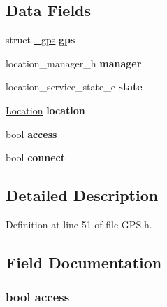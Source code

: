 \subsection*{Data Fields}
\begin{DoxyCompactItemize}
\item 
\hypertarget{structGPSExtends_ab3ecc8b2ec37f482acf1ac0c1a3d5e4e}{struct \hyperlink{struct__gps}{\-\_\-gps} {\bfseries gps}}\label{structGPSExtends_ab3ecc8b2ec37f482acf1ac0c1a3d5e4e}

\item 
\hypertarget{structGPSExtends_a3454051e15c896bc1d5271d43c810958}{location\-\_\-manager\-\_\-h {\bfseries manager}}\label{structGPSExtends_a3454051e15c896bc1d5271d43c810958}

\item 
\hypertarget{structGPSExtends_ad003a392ffec4bbd3a2839bb4e042e56}{location\-\_\-service\-\_\-state\-\_\-e {\bfseries state}}\label{structGPSExtends_ad003a392ffec4bbd3a2839bb4e042e56}

\item 
\hypertarget{structGPSExtends_a260defa82d536dcea2aa22452b862110}{\hyperlink{struct__location}{Location} {\bfseries location}}\label{structGPSExtends_a260defa82d536dcea2aa22452b862110}

\item 
\hypertarget{structGPSExtends_ab4e2372937bb1eec89f2a954a4db6604}{bool {\bfseries access}}\label{structGPSExtends_ab4e2372937bb1eec89f2a954a4db6604}

\item 
\hypertarget{structGPSExtends_af4e68d5926444b7651a9095ee0b26e48}{bool {\bfseries connect}}\label{structGPSExtends_af4e68d5926444b7651a9095ee0b26e48}

\end{DoxyCompactItemize}


\subsection{Detailed Description}


Definition at line 51 of file G\-P\-S.\-h.



\subsection{Field Documentation}
\hypertarget{structGPSExtends_ab4e2372937bb1eec89f2a954a4db6604}{
\subsubsection[{access}]{\setlength{\rightskip}{0pt plus 5cm}bool access}}\label{structGPSExtends_ab4e2372937bb1eec89f2a954a4db6604}


